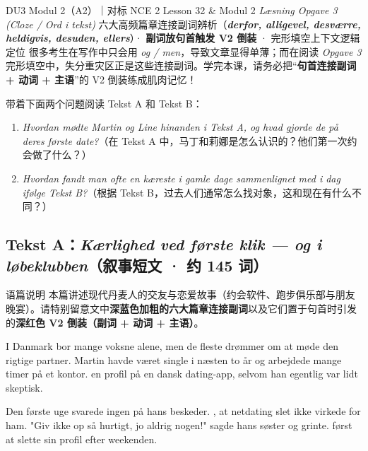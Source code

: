 {DU3 Modul 2（A2）｜对标 NCE 2 Lesson 32 \& Modul 2 \textit{Læsning Opgave 3 (Cloze / Ord i tekst)}}
{六大高频篇章连接副词辨析（\textbf{\textit{derfor, alligevel, desværre, heldigvis, desuden, ellers}}）· \textbf{副词放句首触发 V2 倒装} · 完形填空上下文逻辑定位}
{很多考生在写作中只会用 \textit{og / men}，导致文章显得单薄；而在阅读 \textit{Opgave 3} 完形填空中，失分重灾区正是这些连接副词。学完本课，请务必把“\textbf{句首连接副词 + 动词 + 主语}”的 V2 倒装练成肌肉记忆！}

\begin{foerduleaeser}
带着下面两个问题阅读 Tekst A 和 Tekst B：
\begin{enumerate}
  \item \textit{Hvordan mødte Martin og Line hinanden i Tekst A, og hvad gjorde de på deres første date?}（在 Tekst A 中，马丁和莉娜是怎么认识的？他们第一次约会做了什么？）
  \item \textit{Hvordan fandt man ofte en kæreste i gamle dage sammenlignet med i dag ifølge Tekst B?}（根据 Tekst B，过去人们通常怎么找对象，这和现在有什么不同？）
\end{enumerate}
\end{foerduleaeser}


\subsection*{Tekst A：\textit{Kærlighed ved første klik --- og i løbeklubben}（叙事短文 · 约 145 词）}

\begin{tipbox}{语篇说明}
本篇讲述现代丹麦人的交友与恋爱故事（约会软件、跑步俱乐部与朋友晚宴）。请特别留意文中\textbf{\color{NCDNavy}深蓝色加粗的六大篇章连接副词}以及它们置于句首时引发的\textbf{\color{NCDRed}深红色 V2 倒装（副词 + 动词 + 主语）}。
\end{tipbox}

I Danmark bor mange voksne alene, men de fleste drømmer om at møde den rigtige partner. Martin havde været single i næsten to år og arbejdede mange timer på et kontor.   en profil på en dansk dating-app, selvom han egentlig var lidt skeptisk.

Den første uge svarede ingen på hans beskeder.  , at netdating slet ikke virkede for ham. "Giv ikke op så hurtigt,   jo aldrig nogen!" sagde hans søster og grinte.   først at slette sin profil efter weekenden.


